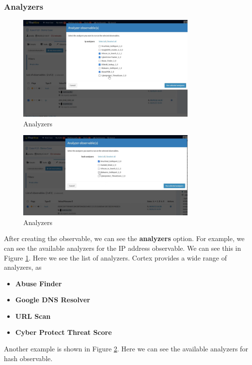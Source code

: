 \documentclass{article}
\begin{document}
\subsubsection{Analyzers}
\begin{figure}[H]
    \centering
    \includegraphics[width=0.8\textwidth]{analyzers.png}
    \caption{Analyzers}
    \label{fig:analyzers}
\end{figure}

\begin{figure}[H]
    \centering
    \includegraphics[width=0.8\textwidth]{analyzers2.png}
    \caption{Analyzers}
    \label{fig:analyzers2}
\end{figure}

After creating the observable, we can see the \textbf{analyzers} option. For example, we can see the available analyzers for the IP address observable.
We can see this in Figure \ref{fig:analyzers}.
Here we see the list of analyzers. Cortex provides a wide range of analyzers, as 
\begin{itemize}
    \item \textbf{Abuse Finder}
    \item \textbf{Google DNS Resolver}
    \item \textbf{URL Scan}
    \item \textbf{Cyber Protect Threat Score}
\end{itemize}
Another example is shown in Figure \ref{fig:analyzers2}. Here we can see the available analyzers for hash observable.
\end{document}
